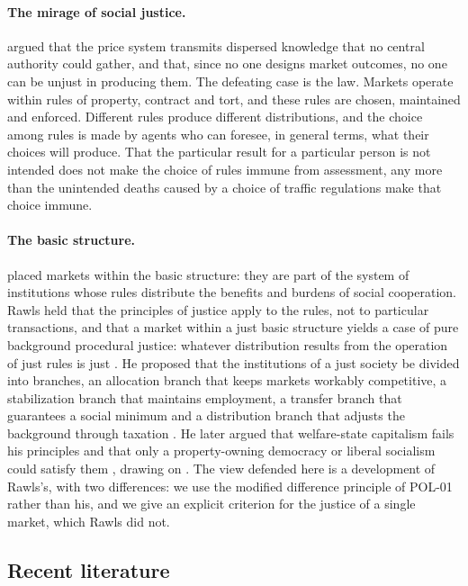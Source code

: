 \documentclass{situationist-preprint}
\begin{document}
\paragraph{The mirage of social justice.} \citet{Hayek1945} argued that the price system transmits dispersed knowledge that no central authority could gather, and \citet{Hayek1976} that, since no one designs market outcomes, no one can be unjust in producing them. The defeating case is the law. Markets operate within rules of property, contract and tort, and these rules are chosen, maintained and enforced. Different rules produce different distributions, and the choice among rules is made by agents who can foresee, in general terms, what their choices will produce. That the particular result for a particular person is not intended does not make the choice of rules immune from assessment, any more than the unintended deaths caused by a choice of traffic regulations make that choice immune.

\paragraph{The basic structure.} \citet[\S\S 14, 42--43]{Rawls1971} placed markets within the basic structure: they are part of the system of institutions whose rules distribute the benefits and burdens of social cooperation. Rawls held that the principles of justice apply to the rules, not to particular transactions, and that a market within a just basic structure yields a case of pure background procedural justice: whatever distribution results from the operation of just rules is just \citep{Rawls1977}. He proposed that the institutions of a just society be divided into branches, an allocation branch that keeps markets workably competitive, a stabilization branch that maintains employment, a transfer branch that guarantees a social minimum and a distribution branch that adjusts the background through taxation \citep[\S 43]{Rawls1971}. He later argued that welfare-state capitalism fails his principles and that only a property-owning democracy or liberal socialism could satisfy them \citep[\S\S 41--42]{Rawls2001}, drawing on \citet{Meade1964}. The view defended here is a development of Rawls's, with two differences: we use the modified difference principle of POL-01 rather than his, and we give an explicit criterion for the justice of a single market, which Rawls did not.

\subsection{Recent literature}
\end{document}

